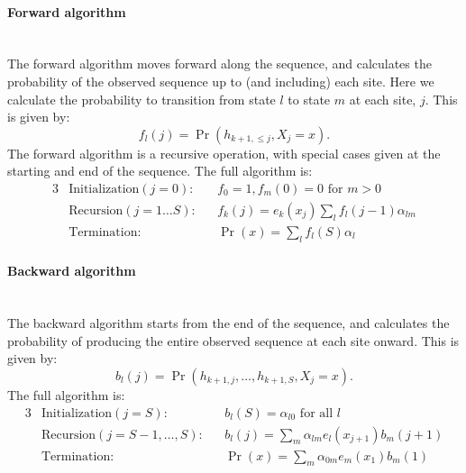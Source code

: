 \paragraph{Forward algorithm} \mbox{} \\
The forward algorithm moves forward along the sequence, and calculates the probability of the observed sequence up to (and including) each site.
Here we calculate the probability to transition from state $l$ to state $m$ at each site, $j$.
This is given by:
\begin{equation}
    f_l(j) = \Pr( h_{k+1, \le j}, X_j=x ).
\end{equation}
The forward algorithm is a recursive operation, with special cases given at the starting and end of the sequence.
The full algorithm is:
\begin{alignat*}{3}
    &\text{Initialization} (j=0):    &&f_0=1, f_m(0) = 0 \text{ for } m>0 \\
    &\text{Recursion} (j=1 \dots S): &&f_{k}(j)= e_{k}(x_j) \sum_l{ f_l( j-1 ) \alpha_{lm} }  \\
    &\text{Termination}:             &&\Pr(x)= \sum_l{ f_l( S ) \alpha_{l} }
\end{alignat*}

%
\paragraph{Backward algorithm} \mbox{} \\
The backward algorithm starts from the end of the sequence, and calculates the probability of producing the entire observed sequence at each site onward.
This is given by:
\begin{equation}
    b_l(j) = \Pr( h_{k+1, j},\dots,h_{k+1,S}, X_j=x ).
\end{equation}
%
The full algorithm is:
\begin{alignat*}{3}
    &\text{Initialization} (j=S):         &&b_l(S)= \alpha_{l0} \text{ for all } l \\
    &\text{Recursion} (j= S-1, \dots, S): &&b_l(j)= \sum_m{ \alpha_{lm} e_l( x_{j+1} ) b_m( j+1 ) } \\
    &\text{Termination}:                  &&\Pr(x)= \sum_m{ \alpha_{0m} e_m (x_1) b_m(1) }
\end{alignat*}

